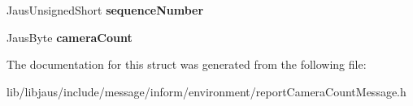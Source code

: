 \begin{DoxyCompactItemize}
\item 
\hypertarget{struct_report_camera_count_message_struct_a0f20f03fbdc8e551a6192f3ae00df085}{\-Jaus\-Unsigned\-Short {\bfseries sequence\-Number}}\label{struct_report_camera_count_message_struct_a0f20f03fbdc8e551a6192f3ae00df085}

\item 
\hypertarget{struct_report_camera_count_message_struct_ade829434ef058275047c44737a1b1a0e}{\-Jaus\-Byte {\bfseries camera\-Count}}\label{struct_report_camera_count_message_struct_ade829434ef058275047c44737a1b1a0e}

\end{DoxyCompactItemize}


\-The documentation for this struct was generated from the following file\-:\begin{DoxyCompactItemize}
\item 
lib/libjaus/include/message/inform/environment/report\-Camera\-Count\-Message.\-h\end{DoxyCompactItemize}
